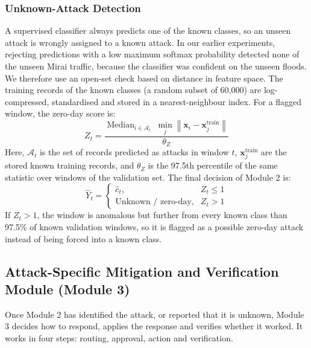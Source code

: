 \documentclass[]{interact}
\theoremstyle{plain}%
\theoremstyle{definition}
\theoremstyle{remark}
\begin{document}
\subsubsection{Unknown-Attack Detection}
A supervised classifier always predicts one of the known classes, so an unseen attack is wrongly assigned to a known attack. In our earlier experiments, rejecting predictions with a low maximum softmax probability detected none of the unseen Mirai traffic, because the classifier was confident on the unseen floods. We therefore use an open-set check based on distance in feature space. The training records of the known classes (a random subset of 60,000) are log-compressed, standardised and stored in a nearest-neighbour index. For a flagged window, the zero-day score is:
\begin{equation}
  Z_t = \frac{\operatorname{Median}_{i \in \mathcal{A}_t}\; \min_{j} \left\lVert \mathbf{x}_i - \mathbf{x}_j^{\text{train}} \right\rVert}{\theta_Z}
\end{equation}
Here, $\mathcal{A}_t$ is the set of records predicted as attacks in window $t$, $\mathbf{x}_j^{\text{train}}$ are the stored known training records, and $\theta_Z$ is the 97.5th percentile of the same statistic over windows of the validation set. The final decision of Module 2 is:
\begin{equation}
  \hat{Y}_t =
  \begin{cases}
    \hat{c}_t, & Z_t \le 1\\
    \text{Unknown / zero-day}, & Z_t > 1
  \end{cases}
\end{equation}
If $Z_t > 1$, the window is anomalous but further from every known class than 97.5\% of known validation windows, so it is flagged as a possible zero-day attack instead of being forced into a known class.

\subsection{Attack-Specific Mitigation and Verification Module (Module 3)}

Once Module 2 has identified the attack, or reported that it is unknown, Module 3 decides how to respond, applies the response and verifies whether it worked. It works in four steps: routing, approval, action and verification.
\end{document}
